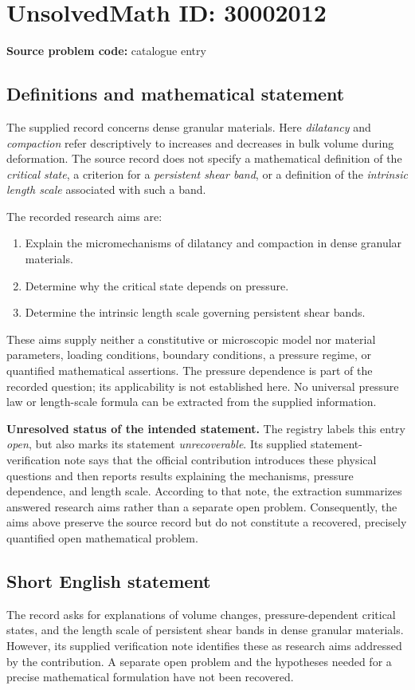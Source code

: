 \documentclass[11pt]{article}
\begin{document}
\section*{UnsolvedMath ID: 30002012}
\textbf{Source problem code:} catalogue entry
\subsection{Definitions and mathematical statement}
The supplied record concerns dense granular materials. Here \emph{dilatancy} and \emph{compaction} refer descriptively to increases and decreases in bulk volume during deformation. The source record does not specify a mathematical definition of the \emph{critical state}, a criterion for a \emph{persistent shear band}, or a definition of the \emph{intrinsic length scale} associated with such a band.

The recorded research aims are:
\begin{enumerate}
\item Explain the micromechanisms of dilatancy and compaction in dense granular materials.
\item Determine why the critical state depends on pressure.
\item Determine the intrinsic length scale governing persistent shear bands.
\end{enumerate}
These aims supply neither a constitutive or microscopic model nor material parameters, loading conditions, boundary conditions, a pressure regime, or quantified mathematical assertions. The pressure dependence is part of the recorded question; its applicability is not established here. No universal pressure law or length-scale formula can be extracted from the supplied information.

\textbf{Unresolved status of the intended statement.} The registry labels this entry \emph{open}, but also marks its statement \emph{unrecoverable}. Its supplied statement-verification note says that the official contribution introduces these physical questions and then reports results explaining the mechanisms, pressure dependence, and length scale. According to that note, the extraction summarizes answered research aims rather than a separate open problem. Consequently, the aims above preserve the source record but do not constitute a recovered, precisely quantified open mathematical problem.
\subsection{Short English statement}
The record asks for explanations of volume changes, pressure-dependent critical states, and the length scale of persistent shear bands in dense granular materials. However, its supplied verification note identifies these as research aims addressed by the contribution. A separate open problem and the hypotheses needed for a precise mathematical formulation have not been recovered.
\end{document}
